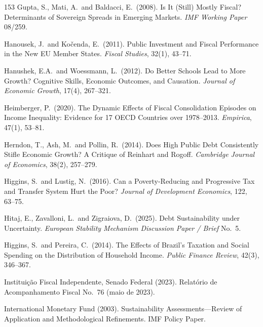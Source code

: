 \documentclass[11pt,a4paper]{article}
\begin{document}
\begin{thebibliography}{153}
 Gupta, S., Mati, A.\ and Baldacci, E.\ (2008). Is It (Still) Mostly Fiscal? Determinants of Sovereign Spreads in Emerging Markets. \textit{IMF Working Paper} 08/259.

 Hanousek, J.\ and Ko\v{c}enda, E.\ (2011). Public Investment and Fiscal Performance in the New EU Member States. \textit{Fiscal Studies}, 32(1), 43--71.

 Hanushek, E.A.\ and Woessmann, L.\ (2012). Do Better Schools Lead to More Growth? Cognitive Skills, Economic Outcomes, and Causation. \textit{Journal of Economic Growth}, 17(4), 267--321.

 Heimberger, P.\ (2020). The Dynamic Effects of Fiscal Consolidation Episodes on Income Inequality: Evidence for 17 OECD Countries over 1978--2013. \textit{Empirica}, 47(1), 53--81.

 Herndon, T., Ash, M.\ and Pollin, R.\ (2014). Does High Public Debt Consistently Stifle Economic Growth? A Critique of Reinhart and Rogoff. \textit{Cambridge Journal of Economics}, 38(2), 257--279.

 Higgins, S.\ and Lustig, N.\ (2016). Can a Poverty-Reducing and Progressive Tax and Transfer System Hurt the Poor? \textit{Journal of Development Economics}, 122, 63--75.

 Hitaj, E., Zavalloni, L.\ and Zigraiova, D.\ (2025). Debt Sustainability under Uncertainty. \textit{European Stability Mechanism Discussion Paper / Brief} No.\ 5.

 Higgins, S.\ and Pereira, C.\ (2014). The Effects of Brazil's Taxation and Social Spending on the Distribution of Household Income. \textit{Public Finance Review}, 42(3), 346--367.

 Instituição Fiscal Independente, Senado Federal (2023). Relat\'orio de Acompanhamento Fiscal No.\ 76 (maio de 2023).

 International Monetary Fund (2003). Sustainability Assessments---Review of Application and Methodological Refinements. IMF Policy Paper.


\end{thebibliography}
\end{document}
